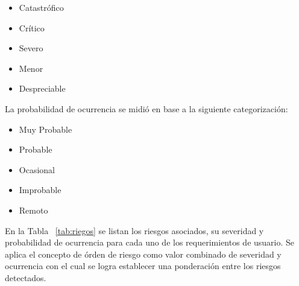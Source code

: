 		\begin{itemize}
		  \item Catastrófico
		  \item Crítico	
		  \item Severo	
		  \item Menor	
		  \item Despreciable 
		\end{itemize}
	
		La probabilidad de ocurrencia se midió en base a la siguiente categorización:
	
		\begin{itemize}
		  \item Muy Probable
		  \item Probable	
		  \item Ocasional
		  \item Improbable 	
		  \item Remoto
		\end{itemize}
		
		En la Tabla ~\ref {tab:riegos} se listan los riesgos asociados, su severidad y probabilidad de ocurrencia para cada uno de los
		requerimientos de usuario. Se aplica el concepto de órden de riesgo como valor combinado de severidad y ocurrencia con el cual se logra establecer
		una ponderación entre los riesgos detectados.
		
		\newpage
		
